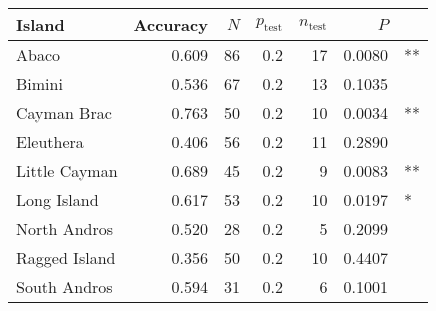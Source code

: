 
\begin{tabular}{lrrrrrl}
\toprule
Island & Accuracy & $N$ & $p_{\mbox{test}}$ & $n_{\mbox{test}}$ & $P$ & \\
\midrule
Abaco & 0.609 & 86 & 0.2 & 17 & 0.0080 & **\\
Bimini & 0.536 & 67 & 0.2 & 13 & 0.1035 & \\
Cayman Brac & 0.763 & 50 & 0.2 & 10 & 0.0034 & **\\
Eleuthera & 0.406 & 56 & 0.2 & 11 & 0.2890 & \\
Little Cayman & 0.689 & 45 & 0.2 & 9 & 0.0083 & **\\
Long Island & 0.617 & 53 & 0.2 & 10 & 0.0197 & *\\
North Andros & 0.520 & 28 & 0.2 & 5 & 0.2099 & \\
Ragged Island & 0.356 & 50 & 0.2 & 10 & 0.4407 & \\
South Andros & 0.594 & 31 & 0.2 & 6 & 0.1001 & \\
\bottomrule
\end{tabular}
